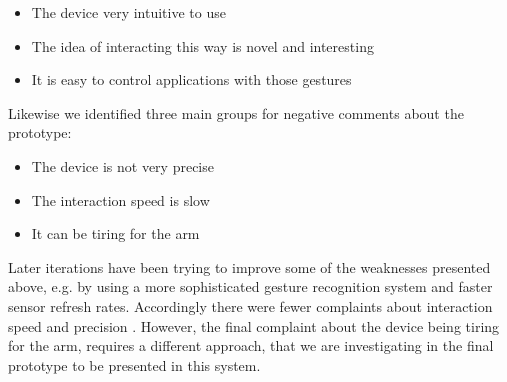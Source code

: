 \begin{itemize}
\item{The device very intuitive to use}
\item{The idea of interacting this way is novel and interesting}
\item{It is easy to control applications with those gestures}
\end{itemize}
Likewise we identified three main groups for negative comments about the prototype:
\begin{itemize}
\item{The device is not very precise}
\item{The interaction speed is slow}
\item{It can be tiring for the arm}
\end{itemize}
Later iterations have been trying to improve some of the weaknesses presented above, e.g. by using a more sophisticated gesture recognition system and faster sensor refresh rates. Accordingly there were fewer complaints about interaction speed and precision \cite{braun2013capacitive}. However, the final complaint about the device being tiring for the arm, requires a different approach, that we are investigating in the final prototype to be presented in this system.
